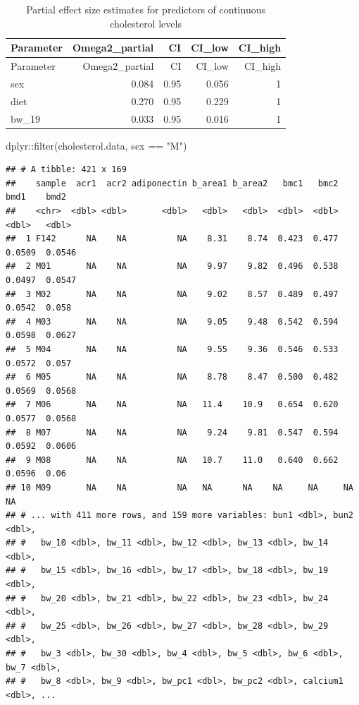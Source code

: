 \documentclass[
]{article}
\newenvironment{Shaded}{\begin{snugshade}}{\end{snugshade}}
\newcommand{\FunctionTok}[1]{\textcolor[rgb]{0.00,0.00,0.00}{#1}}
\newcommand{\NormalTok}[1]{#1}
\newcommand{\SpecialCharTok}[1]{\textcolor[rgb]{0.00,0.00,0.00}{#1}}
\newcommand{\StringTok}[1]{\textcolor[rgb]{0.31,0.60,0.02}{#1}}
\begin{document}
\begin{longtable}[]{@{}lrrrr@{}}
\caption{Partial effect size estimates for predictors of continuous
cholesterol levels}\tabularnewline
\toprule()
Parameter & Omega2\_partial & CI & CI\_low & CI\_high \\
\midrule()
\endfirsthead
\toprule()
Parameter & Omega2\_partial & CI & CI\_low & CI\_high \\
\midrule()
\endhead
sex & 0.084 & 0.95 & 0.056 & 1 \\
diet & 0.270 & 0.95 & 0.229 & 1 \\
bw\_19 & 0.033 & 0.95 & 0.016 & 1 \\
\bottomrule()
\end{longtable}

\begin{Shaded}
\begin{Highlighting}[]
\NormalTok{dplyr}\SpecialCharTok{::}\FunctionTok{filter}\NormalTok{(cholesterol.data, sex }\SpecialCharTok{==} \StringTok{"M"}\NormalTok{)}
\end{Highlighting}
\end{Shaded}

\begin{verbatim}
## # A tibble: 421 x 169
##    sample  acr1  acr2 adiponectin b_area1 b_area2   bmc1   bmc2    bmd1    bmd2
##    <chr>  <dbl> <dbl>       <dbl>   <dbl>   <dbl>  <dbl>  <dbl>   <dbl>   <dbl>
##  1 F142      NA    NA          NA    8.31    8.74  0.423  0.477  0.0509  0.0546
##  2 M01       NA    NA          NA    9.97    9.82  0.496  0.538  0.0497  0.0547
##  3 M02       NA    NA          NA    9.02    8.57  0.489  0.497  0.0542  0.058 
##  4 M03       NA    NA          NA    9.05    9.48  0.542  0.594  0.0598  0.0627
##  5 M04       NA    NA          NA    9.55    9.36  0.546  0.533  0.0572  0.057 
##  6 M05       NA    NA          NA    8.78    8.47  0.500  0.482  0.0569  0.0568
##  7 M06       NA    NA          NA   11.4    10.9   0.654  0.620  0.0577  0.0568
##  8 M07       NA    NA          NA    9.24    9.81  0.547  0.594  0.0592  0.0606
##  9 M08       NA    NA          NA   10.7    11.0   0.640  0.662  0.0596  0.06  
## 10 M09       NA    NA          NA   NA      NA    NA     NA     NA      NA     
## # ... with 411 more rows, and 159 more variables: bun1 <dbl>, bun2 <dbl>,
## #   bw_10 <dbl>, bw_11 <dbl>, bw_12 <dbl>, bw_13 <dbl>, bw_14 <dbl>,
## #   bw_15 <dbl>, bw_16 <dbl>, bw_17 <dbl>, bw_18 <dbl>, bw_19 <dbl>,
## #   bw_20 <dbl>, bw_21 <dbl>, bw_22 <dbl>, bw_23 <dbl>, bw_24 <dbl>,
## #   bw_25 <dbl>, bw_26 <dbl>, bw_27 <dbl>, bw_28 <dbl>, bw_29 <dbl>,
## #   bw_3 <dbl>, bw_30 <dbl>, bw_4 <dbl>, bw_5 <dbl>, bw_6 <dbl>, bw_7 <dbl>,
## #   bw_8 <dbl>, bw_9 <dbl>, bw_pc1 <dbl>, bw_pc2 <dbl>, calcium1 <dbl>, ...
\end{verbatim}
\end{document}
